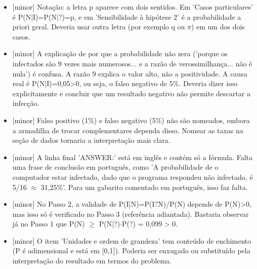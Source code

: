 \documentclass{article}%
\begin{document}
\begin{itemize}%
\item%
{[}minor{]} Notação: a letra p aparece com dois sentidos. Em 'Casos particulares' é P(N|I)=P(N|?)=p, e em 'Sensibilidade à hipótese 2' é a probabilidade a priori geral. Deveria usar outra letra (por exemplo q ou $\pi$) em um dos dois casos.%
\item%
{[}minor{]} A explicação de por que a probabilidade não zera ('porque os infectados são 9 vezes mais numerosos... e a razão de verossimilhança... não é nula') é confusa. A razão 9 explica o valor alto, não a positividade. A causa real é P(N|I)=0,05>0, ou seja, o falso negativo de 5\%. Deveria dizer isso explicitamente e concluir que um resultado negativo não permite descartar a infecção.%
\item%
{[}minor{]} Falso positivo (1\%) e falso negativo (5\%) não são nomeados, embora a armadilha de trocar complementares dependa disso. Nomear as taxas na seção de dados tornaria a interpretação mais clara.%
\item%
{[}minor{]} A linha final 'ANSWER:' está em inglês e contém só a fórmula. Falta uma frase de conclusão em português, como 'A probabilidade de o computador estar infectado, dado que o programa respondeu não infectado, é 5/16 $\approx$ 31,25\%'. Para um gabarito comentado em português, isso faz falta.%
\item%
{[}minor{]} No Passo 2, a validade de P(I|N)=P(I?N)/P(N) depende de P(N)>0, mas isso só é verificado no Passo 3 (referência adiantada). Bastaria observar já no Passo 1 que P(N) $\geq$ P(N|?)$\cdot$P(?) = 0,099 > 0.%
\item%
{[}minor{]} O item 'Unidades e ordem de grandeza' tem conteúdo de enchimento (P é adimensional e está em {[}0,1{]}). Poderia ser enxugado ou substituído pela interpretação do resultado em termos do problema.%
\end{itemize}%
\end{document}
